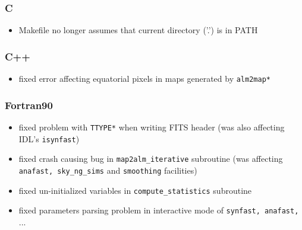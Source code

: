 \documentclass[12pt,twoside]{article}
\begin{document}
{{\subsubsection[C]{C}	
	\begin{itemize}
	\item Makefile no longer assumes that current directory ('.') is in PATH
	\end{itemize}

\subsubsection[C++]{C++}
	\begin{itemize}
	\item fixed error affecting equatorial pixels in maps generated by {\tt alm2map*}
	\end{itemize}

\subsubsection[Fortran90]{Fortran90}
	\begin{itemize}
	\item fixed problem with {\tt TTYPE*} when writing FITS header (was also
affecting IDL's {\tt isynfast})
	\item fixed crash causing bug in {\tt map2alm\_iterative} subroutine (was
affecting {\tt anafast, sky\_ng\_sims} and {\tt smoothing} facilities)
	\item fixed un-initialized variables in {\tt compute\_statistics} subroutine
	\item fixed parameters parsing problem in interactive mode of {\tt synfast, anafast,} ...
	\end{itemize}

}}
\end{document}
